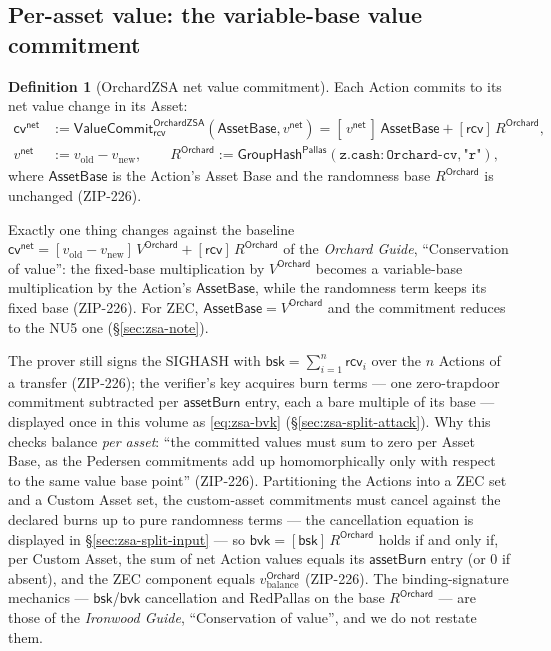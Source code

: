 \documentclass[11pt,a4paper]{article}
\theoremstyle{definition}
\newtheorem{definition}[theorem]{Definition}
\newcommand{\cvsym}{\mathsf{cv}}
\newcommand{\Pallas}{\ensuremath{\mathsf{Pallas}}}
\newcommand{\GroupHash}{\ensuremath{\mathsf{GroupHash}}}
\newcommand{\rcv}{\ensuremath{\mathsf{rcv}}}
\begin{document}
\subsection{Per-asset value: the variable-base value commitment}
\label{sec:zsa-value}

\begin{definition}[OrchardZSA net value commitment]\label{def:zsa-cv}
Each Action commits to its net value change in its Asset:
\[
\begin{aligned}
\cvsym^{\mathsf{net}} &:=
\mathsf{ValueCommit}^{\mathsf{OrchardZSA}}_{\rcv}(\mathsf{AssetBase},
  v^{\mathsf{net}})
= [\,v^{\mathsf{net}}\,]\,\mathsf{AssetBase}
+ [\rcv]\,R^{\mathsf{Orchard}}, \\
v^{\mathsf{net}} &:= v_{\mathrm{old}} - v_{\mathrm{new}},
\qquad
R^{\mathsf{Orchard}} :=
\GroupHash^{\Pallas}(\mathtt{z.cash:Orchard\text{-}cv}, \texttt{"r"}),
\end{aligned}
\]
where $\mathsf{AssetBase}$ is the Action's Asset Base and the randomness
base $R^{\mathsf{Orchard}}$ is unchanged (ZIP-226).
\end{definition}

Exactly one thing changes against the baseline
$\cvsym^{\mathsf{net}} = [v_{\mathrm{old}} - v_{\mathrm{new}}]\,
V^{\mathsf{Orchard}} + [\rcv]\,R^{\mathsf{Orchard}}$ of the \emph{Orchard
Guide}, ``Conservation of value'': the fixed-base multiplication by
$V^{\mathsf{Orchard}}$ becomes a variable-base multiplication by the
Action's $\mathsf{AssetBase}$, while the randomness term keeps its fixed
base (ZIP-226). For ZEC, $\mathsf{AssetBase} = V^{\mathsf{Orchard}}$ and the
commitment reduces to the NU5 one (\S\ref{sec:zsa-note}).

The prover still signs the SIGHASH with
$\mathsf{bsk} = \sum_{i=1}^{n} \rcv_i$ over the $n$ Actions of a transfer
(ZIP-226); the verifier's key acquires burn terms --- one zero-trapdoor
commitment subtracted per $\mathsf{assetBurn}$ entry, each a bare multiple
of its base --- displayed once in this volume as \eqref{eq:zsa-bvk}
(\S\ref{sec:zsa-split-attack}). Why this checks balance \emph{per asset}:
``the committed values must sum to zero per Asset Base, as the Pedersen
commitments add up homomorphically only with respect to the same value
base point'' (ZIP-226). Partitioning the Actions into a ZEC set and a
Custom Asset set, the custom-asset commitments must cancel against the
declared burns up to pure randomness terms --- the cancellation equation
is displayed in \S\ref{sec:zsa-split-input} --- so
$\mathsf{bvk} = [\mathsf{bsk}]\,R^{\mathsf{Orchard}}$ holds if and only
if, per Custom Asset, the sum of net Action values equals its
$\mathsf{assetBurn}$ entry (or $0$ if absent), and the ZEC component
equals $v_{\mathrm{balance}}^{\mathsf{Orchard}}$ (ZIP-226). The
binding-signature mechanics --- $\mathsf{bsk}$/$\mathsf{bvk}$ cancellation
and RedPallas on the base $R^{\mathsf{Orchard}}$ --- are those of the
\emph{Ironwood Guide}, ``Conservation of value'', and we do not restate them.
\end{document}
